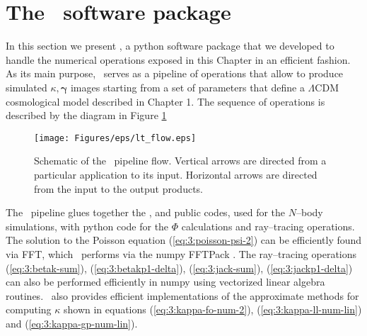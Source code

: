 
\section{The \LT\, software package}
In this section we present \LT \citep{lenstools}, a {\sc python} software package that we developed to handle the numerical operations exposed in this Chapter in an efficient fashion. As its main purpose, \LT\, serves as a pipeline of operations that allow to produce simulated $\kappa,\pmb{\gamma}$ images starting from a set of parameters that define a $\Lambda$CDM cosmological model described in Chapter 1. The sequence of operations is described by the diagram in Figure \ref{fig:3:lt-flow}  
%
\begin{figure}
\begin{center}
\texttt{[image: Figures/eps/lt\_flow.eps]}
\end{center}
\caption{Schematic of the \LT\, pipeline flow. Vertical arrows are directed from a particular application to its input. Horizontal arrows are directed from the input to the output products.}
\label{fig:3:lt-flow}
\end{figure}
%
The \LT\, pipeline glues together the ,  and  public codes, used for the $N$--body simulations, with {\sc python} code for the $\Phi$ calculations and ray--tracing operations. The solution to the Poisson equation (\ref{eq:3:poisson-psi-2}) can be efficiently found via FFT, which \LT\, performs via the {\sc numpy} FFTPack \citep{scipy}. The ray--tracing operations (\ref{eq:3:betak-sum}), (\ref{eq:3:betakp1-delta}), (\ref{eq:3:jack-sum}), (\ref{eq:3:jackp1-delta}) can also be performed efficiently in {\sc numpy} using vectorized linear algebra routines. \LT\, also provides efficient implementations of the approximate methods for computing $\kappa$ shown in equations (\ref{eq:3:kappa-fo-num-2}), (\ref{eq:3:kappa-ll-num-lin}) and (\ref{eq:3:kappa-gp-num-lin}). 

